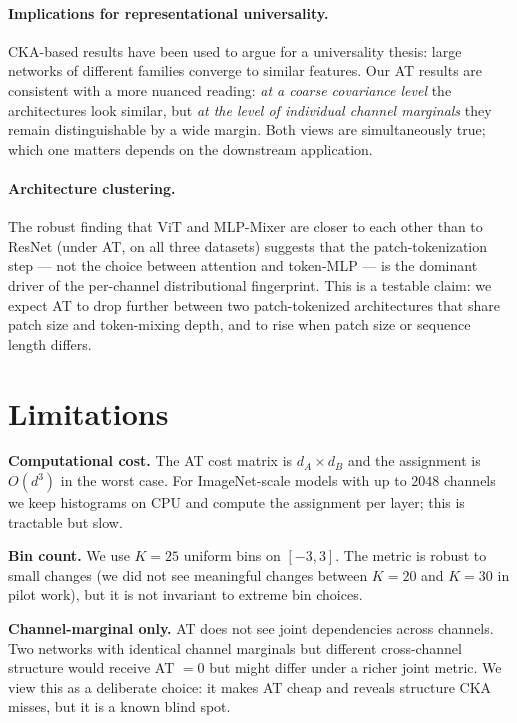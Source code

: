 \documentclass[11pt]{article}
\begin{document}
\paragraph{Implications for representational universality.} CKA-based
results have been used to argue for a universality thesis: large
networks of different families converge to similar features. Our AT
results are consistent with a more nuanced reading: \emph{at a coarse
covariance level} the architectures look similar, but \emph{at the
level of individual channel marginals} they remain distinguishable by
a wide margin. Both views are simultaneously true; which one matters
depends on the downstream application.

\paragraph{Architecture clustering.} The robust finding that
ViT and MLP-Mixer are closer to each other than to ResNet (under AT, on
all three datasets) suggests that the patch-tokenization step --- not
the choice between attention and token-MLP --- is the dominant driver
of the per-channel distributional fingerprint. This is a testable
claim: we expect AT to drop further between two patch-tokenized
architectures that share patch size and token-mixing depth, and to
rise when patch size or sequence length differs.

\section{Limitations}

\textbf{Computational cost.} The AT cost matrix is $d_A \times d_B$ and
the assignment is $O(d^3)$ in the worst case. For ImageNet-scale
models with up to $2048$ channels we keep histograms on CPU and
compute the assignment per layer; this is tractable but slow.

\textbf{Bin count.} We use $K = 25$ uniform bins on $[-3, 3]$. The
metric is robust to small changes (we did not see meaningful changes
between $K=20$ and $K=30$ in pilot work), but it is not invariant to
extreme bin choices.

\textbf{Channel-marginal only.} AT does not see joint dependencies
across channels. Two networks with identical channel marginals but
different cross-channel structure would receive AT $= 0$ but might
differ under a richer joint metric. We view this as a deliberate
choice: it makes AT cheap and reveals structure CKA misses, but it is
a known blind spot.
\end{document}
